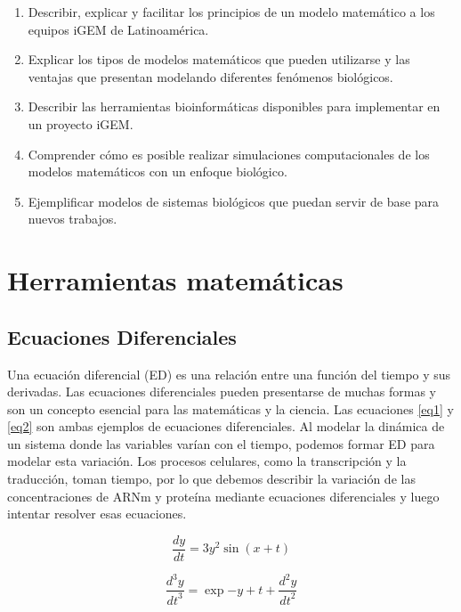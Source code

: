 \documentclass[11pt, letterpaper, spanish]{article}
\begin{document}
\begin{enumerate}
    \item Describir, explicar y facilitar los principios de un modelo matemático a los equipos iGEM de Latinoamérica.
    \item Explicar los tipos de modelos matemáticos que pueden utilizarse y las ventajas que presentan modelando diferentes fenómenos biológicos.   
    \item Describir las herramientas bioinformáticas disponibles para implementar en un proyecto iGEM.
    \item Comprender cómo es posible realizar simulaciones computacionales de los modelos matemáticos con un enfoque biológico.
    \item Ejemplificar modelos de sistemas biológicos que puedan servir de base para nuevos trabajos.
    
\end{enumerate}
\newpage

\newpage
\section{Herramientas matemáticas}
\subsection{Ecuaciones Diferenciales}
\par{Una ecuación diferencial (ED) es una relación entre una función del tiempo y sus derivadas. Las ecuaciones diferenciales pueden presentarse de muchas formas y son un concepto esencial para las matemáticas y la ciencia. Las ecuaciones \ref{eq1} y \ref{eq2} son ambas ejemplos de ecuaciones diferenciales. Al modelar la dinámica de un sistema donde las variables varían con el tiempo, podemos formar ED para modelar esta variación. Los procesos celulares, como la transcripción y la traducción, toman tiempo, por lo que debemos describir la variación de las concentraciones de ARNm y proteína mediante ecuaciones diferenciales y luego intentar resolver esas ecuaciones. }

\begin{equation}
    \frac{d y}{d t}=3 y^2 \sin{\left( x+t  \right)}
    \label{eq1}
\end{equation}

\begin{equation}
    \frac{d^3 y}{{d t}^3}=\exp{-y} + t + \frac{d^2 y}{{d t}^2}
    \label{eq2}
\end{equation}
\end{document}
